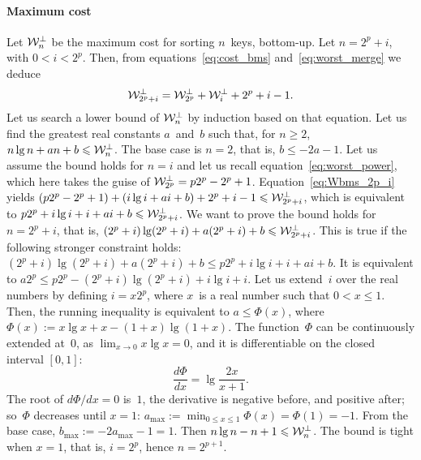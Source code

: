 \paragraph{Maximum cost}

Let \(\mathcal{W}_{n}^{\bot}\) be the maximum cost for sorting \(n\)~keys,
bottom-up. Let \(n=2^p+i\), with \(0 < i < 2^p\). Then, from
equations~\eqref{eq:cost_bms} and~\eqref{eq:worst_merge} we deduce
\begin{equation}
\mathcal{W}_{2^p+i}^{\bot} = \mathcal{W}_{2^p}^{\bot} + \mathcal{W}_{i}^{\bot} + 2^p
+ i - 1.
\label{eq:Wbms_2p_i}
\end{equation}
Let us search a lower bound of \(\mathcal{W}_{n}^{\bot}\) by induction based on
that equation. Let us find the greatest real constants \(a\)~and~\(b\)
such that, for \(n \geqslant 2\), \(n\lg n + an + b \leqslant
\mathcal{W}_{n}^{\bot}\). The base case is \(n=2\), that is, \(b \leqslant -2a -
1\). Let us assume the bound holds for \(n=i\) and let us recall
equation~\eqref{eq:worst_power}, which here takes the guise of
\(\mathcal{W}_{2^p}^{\bot} = p2^p - 2^p + 1\). Equation~\eqref{eq:Wbms_2p_i}
yields \((p2^p - 2^p + 1) + (i\lg i + ai + b) + 2^p + i - 1 \leqslant
\mathcal{W}_{2^p+i}^{\bot}\), which is equivalent to \(p2^p + i\lg i + i + ai + b
\leqslant \mathcal{W}_{2^p+i}^{\bot}\). We want to prove the bound holds for
\(n=2^p+i\), that is, \((2^p+i)\lg(2^p+i) + a(2^p+i) + b \leqslant
\mathcal{W}_{2^p+i}^{\bot}\). This is true if the following stronger constraint
holds: \((2^p+i)\lg(2^p+i) + a(2^p+i) + b \leqslant p2^p + i\lg i + i
+ ai + b\). It is equivalent to \(a2^p \leqslant p2^p -
(2^p+i)\lg(2^p+i) + i\lg i + i\). Let us extend~\(i\) over the real
numbers by defining \(i=x2^p\), where \(x\)~is a real number such that
\(0 < x \leqslant 1\). Then, the running inequality is equivalent to
\(a \leqslant \Phi(x)\), where \(\Phi(x) := x\lg x + x -
(1+x)\lg(1+x)\). The function~\(\Phi\) can be continuously extended
at~\(0\), as \(\lim_{x \to 0} x\lg x = 0\), and it is differentiable
on the closed interval \([0,1]\):
\begin{equation*}
\frac{d\Phi}{dx} = \lg\frac{2x}{x+1}.
\end{equation*}
The root of \(d\Phi/dx = 0\) is~\(1\), the derivative is negative
before, and positive after; so~\(\Phi\) decreases until \(x=1\):
\(a_{\max} := \min_{0 \leqslant x \leqslant 1}\Phi(x) = \Phi(1) =
-1\). From the base case, \(b_{\max} := -2a_{\max} - 1 = 1\). Then
\(n\lg n - n + 1 \leqslant \mathcal{W}_{n}^{\bot}\). The bound is tight when
\(x=1\), that is, \(i=2^p\), hence \(n=2^{p+1}\).

